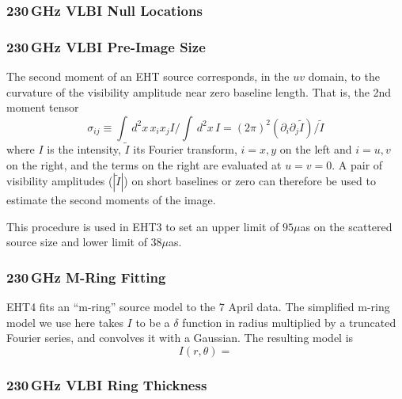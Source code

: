 \subsubsection{230\,GHz VLBI Null Locations}

\subsubsection{230\,GHz VLBI Pre-Image Size}

The second moment of an EHT source corresponds, in the $uv$ domain, to the curvature of the visibility amplitude near zero baseline length.  That is, the 2nd moment tensor
\begin{equation}
    \sigma_{ij} \equiv \int \, d^2x\, x_i x_j I/\int \, d^2x \, I = (2\pi)^2 \left(\partial_i \partial_j \tilde{I}\right)/\tilde{I}
\end{equation}
where $I$ is the intensity, $\tilde{I}$ its Fourier transform, $i = x,y$ on the left and $i = u,v$ on the right, and the terms on the right are evaluated at $u = v = 0$.  A pair of visibility amplitudes ($|\tilde{I}|$) on short baselines or zero can therefore be used to estimate the second moments of the image.  

This procedure is used in EHT3 to set an upper limit of $95\mu$as on the scattered source size and lower limit of $38\mu$as.  

\subsubsection{230\,GHz M-Ring Fitting}

EHT4 fits an ``m-ring'' source model to the 7 April data.  The simplified m-ring model we use here takes $I$ to be a $\delta$ function in radius multiplied by a truncated Fourier series, and convolves it with a Gaussian.  The resulting model is
\begin{equation}
    I(r,\theta) = 
\end{equation}

\subsubsection{230\,GHz VLBI Ring Thickness}



